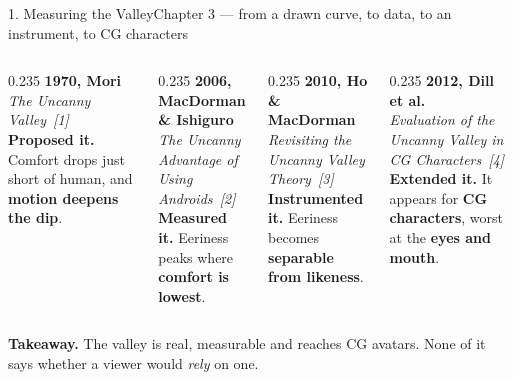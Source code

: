 \documentclass[aspectratio=169,10pt]{beamer}
\newcommand{\hl}[1]{{\color{knblue}\textbf{#1}}}
\newcommand{\takeaway}[1]{%
  \vfill
  \noindent\colorbox{knlight}{\parbox{0.975\textwidth}{\small\color{knblue}\textbf{Takeaway.} #1}}%
  \vspace{0.2em}}
\begin{document}
\begin{frame}{1. Measuring the Valley}{Chapter 3 — from a drawn curve, to data, to an instrument, to CG characters}
\begin{center}
  \end{center}
  \vspace{0.15em}
  \begin{columns}[T]
    \begin{column}{0.235\textwidth}\centering
      {\scriptsize\bfseries 1970, Mori}\\[0.25em]
      {\tiny\color{knblue}\itshape The Uncanny Valley~[1]}\\[0.4em]
      {\scriptsize \hl{Proposed it.} Comfort drops just short of human, and \hl{motion deepens the dip}.}
    \end{column}
    \begin{column}{0.235\textwidth}\centering
      {\scriptsize\bfseries 2006, MacDorman \& Ishiguro}\\[0.25em]
      {\tiny\color{knblue}\itshape The Uncanny Advantage of Using Androids~[2]}\\[0.4em]
      {\scriptsize \hl{Measured it.} Eeriness peaks where \hl{comfort is lowest}.}
    \end{column}
    \begin{column}{0.235\textwidth}\centering
      {\scriptsize\bfseries 2010, Ho \& MacDorman}\\[0.25em]
      {\tiny\color{knblue}\itshape Revisiting the Uncanny Valley Theory~[3]}\\[0.4em]
      {\scriptsize \hl{Instrumented it.} Eeriness becomes \hl{separable from likeness}.}
    \end{column}
    \begin{column}{0.235\textwidth}\centering
      {\scriptsize\bfseries 2012, Dill et al.}\\[0.25em]
      {\tiny\color{knblue}\itshape Evaluation of the Uncanny Valley in CG Characters~[4]}\\[0.4em]
      {\scriptsize \hl{Extended it.} It appears for \hl{CG characters}, worst at the \hl{eyes and mouth}.}
    \end{column}
  \end{columns}
  \takeaway{The valley is real, measurable and reaches CG avatars. None of it says whether a viewer would \emph{rely} on one.}
\end{frame}
\end{document}

